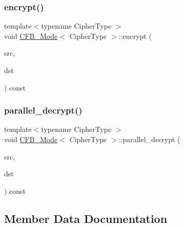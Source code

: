 \mbox{\label{class_c_f_b___mode_a8090129450a70b0d7bddb34b063574bd}} 
\subsubsection{\texorpdfstring{encrypt()}{encrypt()}}
{\footnotesize\ttfamily template$<$typename Cipher\+Type $>$ \\
void \hyperlink{class_c_f_b___mode}{C\+F\+B\+\_\+\+Mode}$<$ Cipher\+Type $>$\+::encrypt (\begin{DoxyParamCaption}\item[{const \hyperlink{class_byte_block}{Byte\+Block} \&}]{src,  }\item[{\hyperlink{class_byte_block}{Byte\+Block} \&}]{dst }\end{DoxyParamCaption}) const}

\mbox{\label{class_c_f_b___mode_af15d9bf13d661e6c3a3d99c136a41150}} 
\subsubsection{\texorpdfstring{parallel\+\_\+decrypt()}{parallel\_decrypt()}}
{\footnotesize\ttfamily template$<$typename Cipher\+Type $>$ \\
void \hyperlink{class_c_f_b___mode}{C\+F\+B\+\_\+\+Mode}$<$ Cipher\+Type $>$\+::parallel\+\_\+decrypt (\begin{DoxyParamCaption}\item[{const \hyperlink{class_byte_block}{Byte\+Block} \&}]{src,  }\item[{\hyperlink{class_byte_block}{Byte\+Block} \&}]{dst }\end{DoxyParamCaption}) const}



\subsection{Member Data Documentation}
\mbox{\label{class_c_f_b___mode_a98305e12bef9c0e5e07b7d2914dc8f52}} 
